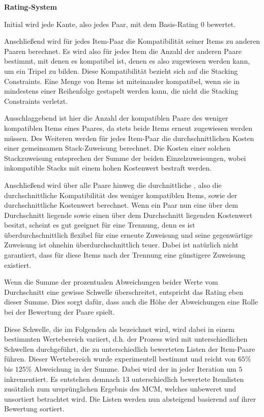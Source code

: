 \textbf{Rating-System}

Initial wird jede Kante, also jedes Paar, mit dem Basis-Rating $0$ bewertet.

Anschließend wird für jedes Item-Paar die Kompatibilität seiner Items zu anderen Paaren berechnet.
Es wird also für jedes Item die Anzahl der anderen Paare bestimmt, mit denen es kompatibel ist, denen es also
zugewiesen werden kann, um ein Tripel zu bilden. Diese Kompatibilität bezieht sich auf die Stacking Constraints.
Eine Menge von Items ist miteinander kompatibel, wenn sie in mindestens einer Reihenfolge gestapelt werden kann,
die nicht die Stacking Constraints verletzt.

Ausschlaggebend ist hier die Anzahl der kompatiblen Paare des weniger kompatiblen Items eines Paares,
da stets beide Items erneut zugewiesen werden müssen.
Des Weiteren werden für jedes Item-Paar die durchschnittlichen Kosten einer gemeinsamen Stack-Zuweisung berechnet.
Die Kosten einer solchen Stackzuweisung entsprechen der Summe der beiden Einzelzuweisungen,
wobei inkompatible Stacks mit einem hohen Kostenwert bestraft werden.

Anschließend wird über alle Paare hinweg die durchnittliche , also die durchschnittliche
Kompatibilität des weniger kompatiblen Items, sowie der durchschnittliche Kostenwert berechnet.
Wenn ein Paar nun eine über dem Durchschnitt liegende  sowie einen über dem Durchschnitt
liegenden Kostenwert besitzt, scheint es gut geeignet für eine Trennung, denn es ist überdurchschnittlich flexibel
für eine erneute Zuweisung und seine gegenwärtige Zuweisung ist ohnehin überdurchschnittlich teuer. Dabei ist natürlich nicht garantiert,
dass für diese Items nach der Trennung eine günstigere Zuweisung existiert.

Wenn die Summe der prozentualen Abweichungen beider Werte vom Durchschnitt eine gewisse Schwelle
überschreitet, entspricht das Rating eben dieser Summe. Dies sorgt dafür, dass auch die Höhe der Abweichungen eine
Rolle bei der Bewertung der Paare spielt.

Diese Schwelle, die im Folgenden als  bezeichnet wird, wird dabei in einem bestimmten Wertebereich
variiert, d.h. der Prozess wird mit unterschiedlichen Schwellen durchgeführt, die zu unterschiedlich bewerteten Listen
der Item-Paare führen. Dieser Wertebereich wurde experimentell bestimmt und reicht von $65 \%$ bis $125 \%$ Abweichung in der Summe.
Dabei wird der  in jeder Iteration um $5$ inkrementiert. Es entstehen demnach 13 unterschiedlich bewertete Itemlisten zusätzlich zum ursprünglichen Ergebnis des \textsc{MCM}, welches unbeweret und unsortiert betrachtet wird. Die Listen werden nun absteigend basierend auf ihrer Bewertung sortiert.

